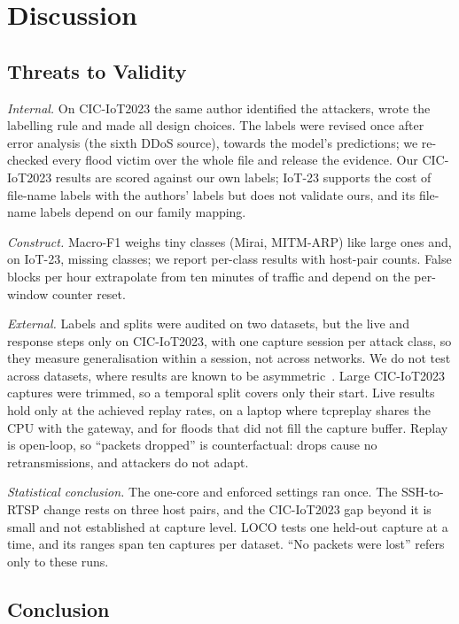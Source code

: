 \section{Discussion}\label{sec:discussion}

\subsection{Threats to Validity}\label{sec:threats}

\emph{Internal.} On CIC-IoT2023 the same author identified the attackers, wrote the labelling rule and made all design choices. The labels were revised once after error analysis (the sixth DDoS source), towards the model's predictions; we re-checked every flood victim over the whole file and release the evidence. Our CIC-IoT2023 results are scored against our own labels; IoT-23 supports the cost of file-name labels with the authors' labels but does not validate ours, and its file-name labels depend on our family mapping.

\emph{Construct.} Macro-F1 weighs tiny classes (Mirai, MITM-ARP) like large ones and, on IoT-23, missing classes; we report per-class results with host-pair counts. False blocks per hour extrapolate from ten minutes of traffic and depend on the per-window counter reset.

\emph{External.} Labels and splits were audited on two datasets, but the live and response steps only on CIC-IoT2023, with one capture session per attack class, so they measure generalisation within a session, not across networks. We do not test across datasets, where results are known to be asymmetric~\cite{ali2026siamxbert}. Large CIC-IoT2023 captures were trimmed, so a temporal split covers only their start. Live results hold only at the achieved replay rates, on a laptop where tcpreplay shares the CPU with the gateway, and for floods that did not fill the capture buffer. Replay is open-loop, so ``packets dropped'' is counterfactual: drops cause no retransmissions, and attackers do not adapt.

\emph{Statistical conclusion.} The one-core and enforced settings ran once. The SSH-to-RTSP change rests on three host pairs, and the CIC-IoT2023 gap beyond it is small and not established at capture level. LOCO tests one held-out capture at a time, and its ranges span ten captures per dataset. ``No packets were lost'' refers only to these runs.

\subsection{Conclusion}

